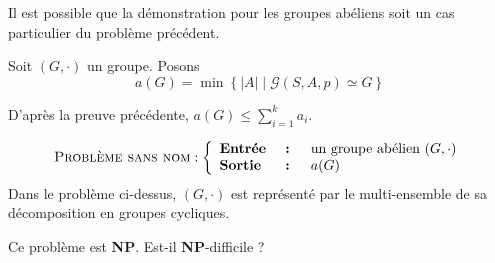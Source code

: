 \begin{remarque}
Il est possible que la démonstration pour les groupes abéliens soit un cas particulier du problème précédent.
\end{remarque}

\begin{definition}
Soit $(G, \cdot)$ un groupe.
Posons
$$
a(G) = \min \left\{ |A| \;|\; \mathcal{G}(S, A, p) \simeq G \right\}
$$
\end{definition}

\begin{remarque}
D'après la preuve précédente, $a(G) \leqslant \sum_{i = 1}^k  a_i$.
\end{remarque}

\begin{question}
$$
\normalfont{\textsc{Problème sans nom}} :
\left\{ \begin{array}{lcl}
\text{\textbf{Entrée}} & \textbf{ : } & \text{un groupe abélien } (G, \cdot) \\
\text{\textbf{Sortie}} & \textbf{ : } & a(G)
\end{array} \right.
$$
Dans le problème ci-dessus, $(G, \cdot)$ est représenté par le multi-ensemble de
sa décomposition en groupes cycliques.

Ce problème est \textbf{NP}. Est-il \textbf{NP}-difficile ?
\end{question}